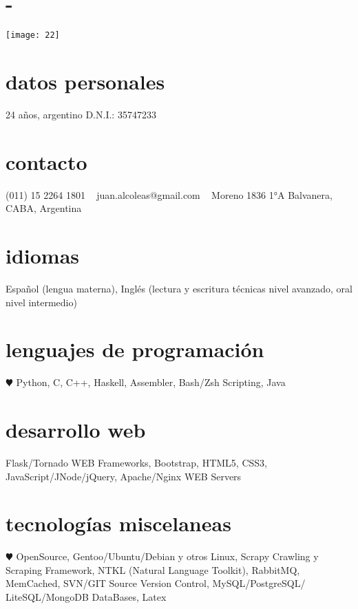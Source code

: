 \documentclass[espanol]{cv-style}     %
\begin{document}
	
	\lastupdated
	
	\begin{aside}
		\section{-}
		\texttt{[image: 22]}
		\section{datos personales}
		24 años, argentino
		D.N.I.: 35747233
		\section{contacto}
		(011) 15 2264 1801
		~
		juan.alcoleas@gmail.com
		~
		Moreno 1836 1°A
		Balvanera, CABA, Argentina
		\section{idiomas}
		Español (lengua materna),
		Inglés (lectura y escritura técnicas nivel avanzado, oral nivel intermedio)
		\section{lenguajes de programación}
		{\color{red} $\varheartsuit$} Python, C, C++, Haskell, Assembler, Bash/Zsh Scripting, Java
		\section{desarrollo web}
		Flask/Tornado WEB Frameworks, Bootstrap, HTML5, CSS3, JavaScript/JNode/jQuery, Apache/Nginx WEB Servers
		\section{tecnologías miscelaneas}
		{\color{red} $\varheartsuit$} OpenSource, Gentoo/Ubuntu/Debian y otros Linux, Scrapy Crawling y Scraping Framework, NTKL (Natural Language Toolkit), RabbitMQ, MemCached, SVN/GIT Source Version Control, MySQL/PostgreSQL/ LiteSQL/MongoDB DataBases, Latex
	\end{aside}
	\vspace{0.2cm}
\end{document}

